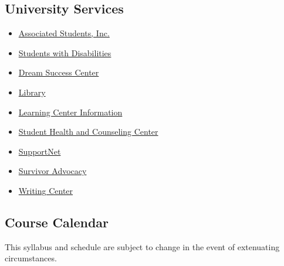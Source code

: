 \subsection{University Services}\label{university-services}

\begin{itemize}
\tightlist
\item
  \href{http://fresnostateasi.org/}{Associated Students, Inc.}
\item
  \href{http://fresnostate.edu/studentaffairs/ssd/}{Students with
  Disabilities}
\item
  \href{http://fresnostate.edu/studentaffairs/dsc/index.html}{Dream
  Success Center}
\item
  \href{https://library.fresnostate.edu/}{Library}
\item
  \href{http://fresnostate.edu/studentaffairs/lrc}{Learning Center
  Information}
\item
  \href{https://www.fresnostate.edu/studentaffairs/health/}{Student
  Health and Counseling Center}
\item
  \href{https://studentaffairs.fresnostate.edu/lrc/supportnet/index.html}{SupportNet}
\item
  \href{https://studentaffairs.fresnostate.edu/survivoradvocate/}{Survivor
  Advocacy}
\item
  \href{http://www.fresnostate.edu/artshum/writingcenter/}{Writing
  Center}
\end{itemize}

\subsection{Course Calendar}\label{course-calendar}

This syllabus and schedule are subject to change in the event of
extenuating circumstances.

